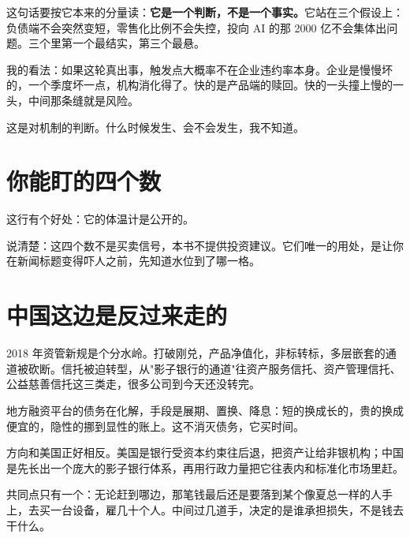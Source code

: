 这句话要按它本来的分量读：\textbf{它是一个判断，不是一个事实。}它站在三个假设上：负债端不会突然变短，零售化比例不会失控，投向 AI 的那 2000 亿不会集体出问题。三个里第一个最结实，第三个最悬。

我的看法：如果这轮真出事，触发点大概率不在企业违约率本身。企业是慢慢坏的，一个季度坏一点，机构消化得了。快的是产品端的赎回。快的一头撞上慢的一头，中间那条缝就是风险。

这是对机制的判断。什么时候发生、会不会发生，我不知道。

\section{你能盯的四个数}

这行有个好处：它的体温计是公开的。

\begin{flowlist}
\end{flowlist}

说清楚：这四个数不是买卖信号，本书不提供投资建议。它们唯一的用处，是让你在新闻标题变得吓人之前，先知道水位到了哪一格。

\section{中国这边是反过来走的}

2018 年资管新规是个分水岭。打破刚兑，产品净值化，非标转标，多层嵌套的通道被砍断。信托被迫转型，从"影子银行的通道"往资产服务信托、资产管理信托、公益慈善信托这三类走，很多公司到今天还没转完。

地方融资平台的债务在化解，手段是展期、置换、降息：短的换成长的，贵的换成便宜的，隐性的挪到显性的账上。这不消灭债务，它买时间。

方向和美国正好相反。美国是银行受资本约束往后退，把资产让给非银机构；中国是先长出一个庞大的影子银行体系，再用行政力量把它往表内和标准化市场里赶。

共同点只有一个：无论赶到哪边，那笔钱最后还是要落到某个像夏总一样的人手上，去买一台设备，雇几十个人。中间过几道手，决定的是谁承担损失，不是钱去干什么。

